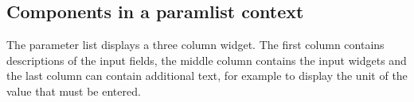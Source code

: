 

\subsection{Components in a paramlist context}
The parameter list displays a three column widget. The first column contains
descriptions of the input fields, the middle column contains the input widgets
and the last column can contain additional text, for example to display the
unit of the value that must be entered.

